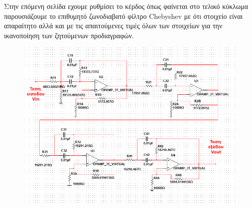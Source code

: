 \documentclass{article}
\begin{document}
{{\begin{figure}[h!]
\end{figure} 
\newpage
Στην επόμενη σελίδα εχουμε ρυθμίσει το κέρδος όπως φαίνεται στο τελικό κύκλωμα παρουσιάζουμε το επιθυμητό ζωνοδιαβατό φίλτρο Chebyshev με ότι στοιχείο είναι απαραίτητο αλλά και με τις απαιτούμενες τιμές όλων των στοιχείων για την ικανοποίηση των ζητούμενων προδιαγραφών.
\begin{figure}[h!]
\centering
 	\advance\leftskip-4cm
  \includegraphics[width=200mm,scale=2]{nokanon_bandpass2.png}
\end{figure} 
\newpage
}}
\end{document}
